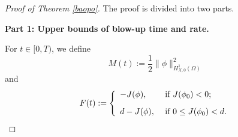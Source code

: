 \documentclass[11pt,a4paper]{article}
\numberwithin{equation}{section}
\newcommand{\ds}{\displaystyle}
\numberwithin{remark}{section}
\begin{document}
\begin{proof}[Proof of Theorem \ref{baopo}]
The proof is divided into two parts.

{\bf Part 1: Upper bounds of blow-up time and rate.}

For $t\in[0,T)$, we define
\begin{equation}\label{18}
M(t):=\frac{1}{2}\|\phi\|_{H_{X,0}^1(\Omega)}^2
\end{equation}
and
\begin{equation}\label{17}
F(t):=\left\{
               \begin{array}{ll}
               \ds  -J(\phi),&\hbox{ if }J(\phi_0)<0; \\
               \vspace{-0.05in}\\
               \ds  d-J(\phi),&\hbox{ if }0\leq J(\phi_0)<d.
               \end{array}
             \right.
\end{equation}


\end{proof}
\end{document}
